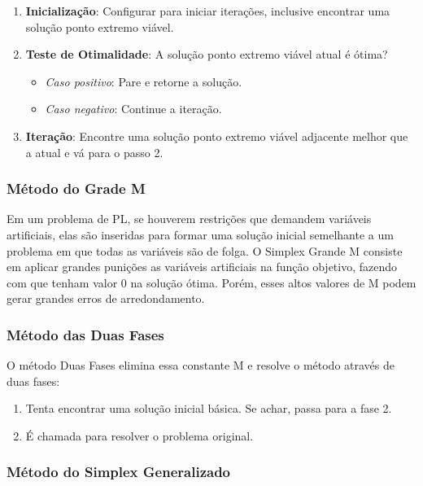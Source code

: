 \documentclass [11pt]{articleSBPO}
\begin{document}
\begin{enumerate}
	\item \textbf{Inicialização}: Configurar para iniciar iterações, inclusive encontrar uma solução ponto extremo viável.
	\item \textbf{Teste de Otimalidade}: A solução ponto extremo viável atual é ótima?
	\begin{itemize}
		\item \textit{Caso positivo}: Pare e retorne a solução.
		\item \textit{Caso negativo}: Continue a iteração.
	\end{itemize}
	\item \textbf{Iteração}: Encontre uma solução ponto extremo viável adjacente melhor que a atual e vá para o passo 2.
\end{enumerate}

\subsubsection{Método do Grade M}\label{subsubsec:grandem}

Em um problema de PL, se houverem restrições que demandem variáveis artificiais, elas são inseridas para formar uma solução inicial semelhante a um problema em que todas as variáveis são de folga. O Simplex Grande M consiste em aplicar grandes punições as variáveis artificiais na função objetivo, fazendo com que tenham valor 0 na solução ótima.
Porém, esses altos valores de M podem gerar grandes erros de arredondamento. 

\subsubsection{Método das Duas Fases}\label{subsubsec:duasfases}

O método Duas Fases elimina essa constante M e resolve o método através de duas fases:

\begin{enumerate}
	\item Tenta encontrar uma solução inicial básica. Se achar, passa para a fase 2.
	\item É chamada para resolver o problema original.
\end{enumerate}

\subsubsection{Método do Simplex Generalizado}\label{subsubsec:generalizado}
\end{document}
